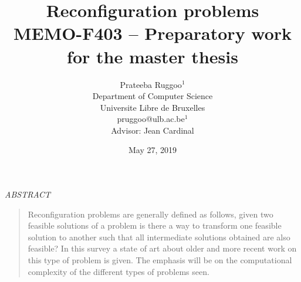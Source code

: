 \documentclass[12pt]{article}
\title{Reconfiguration problems\\
\small MEMO-F403 -- Preparatory work for the master thesis}
\author{Prateeba Ruggoo$^1$  \\  Department of Computer
Science \\ Universite Libre de Bruxelles\\ {\small pruggoo@ulb.ac.be$^1$}\\[0.5cm]{\small Advisor:
Jean Cardinal}}
\date{May 27, 2019}
\numberwithin{theorem}{subsection}
\begin{document}
  \maketitle




\begin{center} {\sl ABSTRACT} \end{center}

\begin{quotation}
Reconfiguration problems are generally defined as follows, given two feasible solutions of a problem is there a way to transform one feasible solution to another such that all intermediate solutions obtained are also feasible?
In this survey a state of art about older and more recent work on this type of problem is given. The emphasis will be on the computational complexity of the different types of problems seen. 
\end{quotation}









\newpage
\nocite{*}


\end{document}
